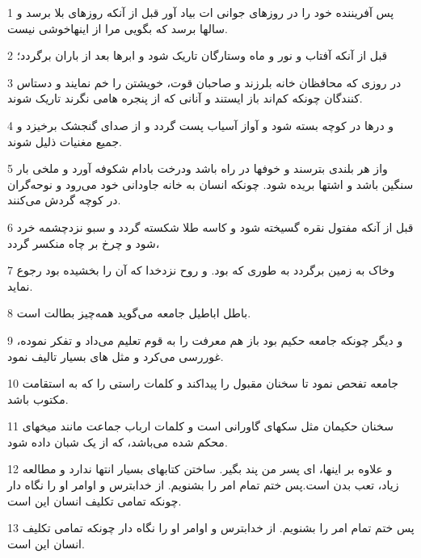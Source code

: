 \par 1 پس آفریننده خود را در روزهای جوانی ات بیاد آور قبل از آنکه روزهای بلا برسد و سالها برسد که بگویی مرا از اینهاخوشی نیست.
\par 2 قبل از آنکه آفتاب و نور و ماه وستارگان تاریک شود و ابرها بعد از باران برگردد؛
\par 3 در روزی که محافظان خانه بلرزند و صاحبان قوت، خویشتن را خم نمایند و دستاس کنندگان چونکه کم‌اند باز ایستند و آنانی که از پنجره هامی نگرند تاریک شوند.
\par 4 و درها در کوچه بسته شود و آواز آسیاب پست گردد و از صدای گنجشک برخیزد و جمیع مغنیات ذلیل شوند.
\par 5 واز هر بلندی بترسند و خوفها در راه باشد ودرخت بادام شکوفه آورد و ملخی بار سنگین باشد و اشتها بریده شود. چونکه انسان به خانه جاودانی خود می‌رود و نوحه‌گران در کوچه گردش می‌کنند.
\par 6 قبل از آنکه مفتول نقره گسیخته شود و کاسه طلا شکسته گردد و سبو نزدچشمه خرد شود و چرخ بر چاه منکسر گردد،
\par 7 وخاک به زمین برگردد به طوری که بود. و روح نزدخدا که آن را بخشیده بود رجوع نماید.
\par 8 باطل اباطیل جامعه می‌گوید همه‌چیز بطالت است.
\par 9 و دیگر چونکه جامعه حکیم بود باز هم معرفت را به قوم تعلیم می‌داد و تفکر نموده، غوررسی می‌کرد و مثل های بسیار تالیف نمود.
\par 10 جامعه تفحص نمود تا سخنان مقبول را پیداکند و کلمات راستی را که به استقامت مکتوب باشد.
\par 11 سخنان حکیمان مثل سکهای گاورانی است و کلمات ارباب جماعت مانند میخهای محکم شده می‌باشد، که از یک شبان داده شود.
\par 12 و علاوه بر اینها، ای پسر من پند بگیر. ساختن کتابهای بسیار انتها ندارد و مطالعه زیاد، تعب بدن است.پس ختم تمام امر را بشنویم. از خدابترس و اوامر او را نگاه دار چونکه تمامی تکلیف انسان این است.
\par 13 پس ختم تمام امر را بشنویم. از خدابترس و اوامر او را نگاه دار چونکه تمامی تکلیف انسان این است.

